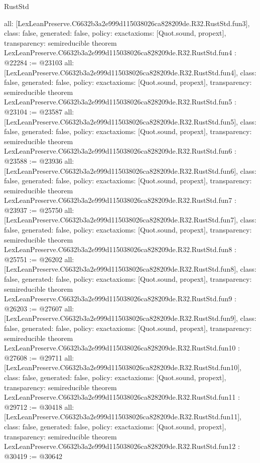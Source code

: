 \begin{lexlean}{RustStd}
\begin{coremodule}
{  all: [LexLeanPreserve.C6632b3a2e999d115038026ca828209de.R32.RustStd.fun3],
  class: false,
  generated: false,
  policy: exact{axioms: [Quot.sound, propext]},
  transparency: semireducible
}
theorem LexLeanPreserve.C6632b3a2e999d115038026ca828209de.R32.RustStd.fun4 : @22284 := @23103 {
  all: [LexLeanPreserve.C6632b3a2e999d115038026ca828209de.R32.RustStd.fun4],
  class: false,
  generated: false,
  policy: exact{axioms: [Quot.sound, propext]},
  transparency: semireducible
}
theorem LexLeanPreserve.C6632b3a2e999d115038026ca828209de.R32.RustStd.fun5 : @23104 := @23587 {
  all: [LexLeanPreserve.C6632b3a2e999d115038026ca828209de.R32.RustStd.fun5],
  class: false,
  generated: false,
  policy: exact{axioms: [Quot.sound, propext]},
  transparency: semireducible
}
theorem LexLeanPreserve.C6632b3a2e999d115038026ca828209de.R32.RustStd.fun6 : @23588 := @23936 {
  all: [LexLeanPreserve.C6632b3a2e999d115038026ca828209de.R32.RustStd.fun6],
  class: false,
  generated: false,
  policy: exact{axioms: [Quot.sound, propext]},
  transparency: semireducible
}
theorem LexLeanPreserve.C6632b3a2e999d115038026ca828209de.R32.RustStd.fun7 : @23937 := @25750 {
  all: [LexLeanPreserve.C6632b3a2e999d115038026ca828209de.R32.RustStd.fun7],
  class: false,
  generated: false,
  policy: exact{axioms: [Quot.sound, propext]},
  transparency: semireducible
}
theorem LexLeanPreserve.C6632b3a2e999d115038026ca828209de.R32.RustStd.fun8 : @25751 := @26202 {
  all: [LexLeanPreserve.C6632b3a2e999d115038026ca828209de.R32.RustStd.fun8],
  class: false,
  generated: false,
  policy: exact{axioms: [Quot.sound, propext]},
  transparency: semireducible
}
theorem LexLeanPreserve.C6632b3a2e999d115038026ca828209de.R32.RustStd.fun9 : @26203 := @27607 {
  all: [LexLeanPreserve.C6632b3a2e999d115038026ca828209de.R32.RustStd.fun9],
  class: false,
  generated: false,
  policy: exact{axioms: [Quot.sound, propext]},
  transparency: semireducible
}
theorem LexLeanPreserve.C6632b3a2e999d115038026ca828209de.R32.RustStd.fun10 : @27608 := @29711 {
  all: [LexLeanPreserve.C6632b3a2e999d115038026ca828209de.R32.RustStd.fun10],
  class: false,
  generated: false,
  policy: exact{axioms: [Quot.sound, propext]},
  transparency: semireducible
}
theorem LexLeanPreserve.C6632b3a2e999d115038026ca828209de.R32.RustStd.fun11 : @29712 := @30418 {
  all: [LexLeanPreserve.C6632b3a2e999d115038026ca828209de.R32.RustStd.fun11],
  class: false,
  generated: false,
  policy: exact{axioms: [Quot.sound, propext]},
  transparency: semireducible
}
theorem LexLeanPreserve.C6632b3a2e999d115038026ca828209de.R32.RustStd.fun12 : @30419 := @30642 {
}
\end{coremodule}
\end{lexlean}
